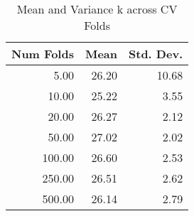 \begin{table}[ht]
\centering
\begin{tabular}{rrr}
  \hline
Num Folds & Mean & Std. Dev. \\ 
  \hline
5.00 & 26.20 & 10.68 \\ 
  10.00 & 25.22 & 3.55 \\ 
  20.00 & 26.27 & 2.12 \\ 
  50.00 & 27.02 & 2.02 \\ 
  100.00 & 26.60 & 2.53 \\ 
  250.00 & 26.51 & 2.62 \\ 
  500.00 & 26.14 & 2.79 \\ 
   \hline
\end{tabular}
\caption{Mean and Variance k across CV Folds} 
\label{tab:cv_vars}
\end{table}
